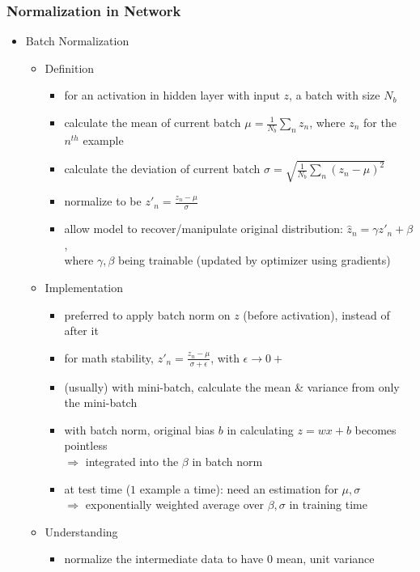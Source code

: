 \subsubsection{Normalization in Network}
\begin{itemize}
\item Batch Normalization
	\begin{itemize}
	\item Definition
		\begin{itemize}
		\item for an activation in hidden layer with input $z$, a batch with size $N_b$
		\item calculate the mean of current batch $\displaystyle \mu=\frac 1 {N_b} \sum_n z_n$, where $z_n$ for the $n^{th}$ example 
		\item calculate the deviation of current batch $\displaystyle \sigma = \sqrt{\frac 1 {N_b} \sum_n(z_n-\mu)^2}$
		\item normalize to be $z'_n = \frac {z_n-\mu}{\sigma}$
		\item allow model to recover/manipulate original distribution: $\hat z_n=\gamma z'_n + \beta$, \\
		where $\gamma, \beta$ being trainable (updated by optimizer using gradients)
		\end{itemize}
	\item Implementation
		\begin{itemize}
		\item preferred to apply batch norm on $z$ (before activation), instead of after it
		\item for math stability, $z'_n=\frac {z_n-\mu}{\sigma+\epsilon}$, with $\epsilon\rightarrow 0+$
		\item (usually) with mini-batch, calculate the mean \& variance from only the mini-batch
		\item with batch norm, original bias $b$ in calculating $z=wx+b$ becomes pointless \\
		$\Rightarrow$ integrated into the $\beta$ in batch norm
		\item at test time ($1$ example a time): need an estimation for $\mu, \sigma$ \\
		$\Rightarrow$ exponentially weighted average over $\beta, \sigma$ in training time
		\end{itemize}
	\item Understanding
		\begin{itemize}
		\item normalize the intermediate data to have $0$ mean, unit variance \\

\end{itemize}
\end{itemize}
\end{itemize}
